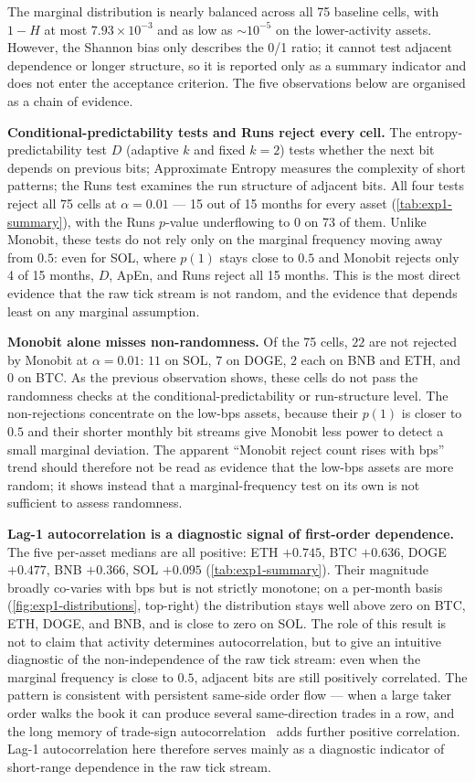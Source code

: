 \documentclass[11pt,titlepage,openany,oneside]{book}  %
\begin{document}
The marginal distribution is nearly balanced across all 75 baseline cells, with $1 - H$ at most $7.93 \times 10^{-3}$ and as low as $\sim 10^{-5}$ on the lower-activity assets. However, the Shannon bias only describes the 0/1 ratio; it cannot test adjacent dependence or longer structure, so it is reported only as a summary indicator and does not enter the acceptance criterion. The five observations below are organised as a chain of evidence.

\textbf{Conditional-predictability tests and Runs reject every cell.} The entropy-predictability test $D$ (adaptive $k$ and fixed $k = 2$) tests whether the next bit depends on previous bits; Approximate Entropy measures the complexity of short patterns; the Runs test examines the run structure of adjacent bits. All four tests reject all 75 cells at $\alpha = 0.01$ --- 15 out of 15 months for every asset (\cref{tab:exp1-summary}), with the Runs $p$-value underflowing to $0$ on 73 of them. Unlike Monobit, these tests do not rely only on the marginal frequency moving away from $0.5$: even for SOL, where $p(1)$ stays close to $0.5$ and Monobit rejects only 4 of 15 months, $D$, ApEn, and Runs reject all 15 months. This is the most direct evidence that the raw tick stream is not random, and the evidence that depends least on any marginal assumption.

\textbf{Monobit alone misses non-randomness.} Of the 75 cells, $22$ are not rejected by Monobit at $\alpha = 0.01$: $11$ on SOL, $7$ on DOGE, $2$ each on BNB and ETH, and $0$ on BTC. As the previous observation shows, these cells do not pass the randomness checks at the conditional-predictability or run-structure level. The non-rejections concentrate on the low-bps assets, because their $p(1)$ is closer to $0.5$ and their shorter monthly bit streams give Monobit less power to detect a small marginal deviation. The apparent ``Monobit reject count rises with bps'' trend should therefore not be read as evidence that the low-bps assets are more random; it shows instead that a marginal-frequency test on its own is not sufficient to assess randomness.

\textbf{Lag-1 autocorrelation is a diagnostic signal of first-order dependence.} The five per-asset medians are all positive: ETH $+0.745$, BTC $+0.636$, DOGE $+0.477$, BNB $+0.366$, SOL $+0.095$ (\cref{tab:exp1-summary}). Their magnitude broadly co-varies with bps but is not strictly monotone; on a per-month basis (\cref{fig:exp1-distributions}, top-right) the distribution stays well above zero on BTC, ETH, DOGE, and BNB, and is close to zero on SOL. The role of this result is not to claim that activity determines autocorrelation, but to give an intuitive diagnostic of the non-independence of the raw tick stream: even when the marginal frequency is close to $0.5$, adjacent bits are still positively correlated. The pattern is consistent with persistent same-side order flow --- when a large taker order walks the book it can produce several same-direction trades in a row, and the long memory of trade-sign autocorrelation~\citep{lillo2004longmemory} adds further positive correlation. Lag-1 autocorrelation here therefore serves mainly as a diagnostic indicator of short-range dependence in the raw tick stream.
\end{document}
